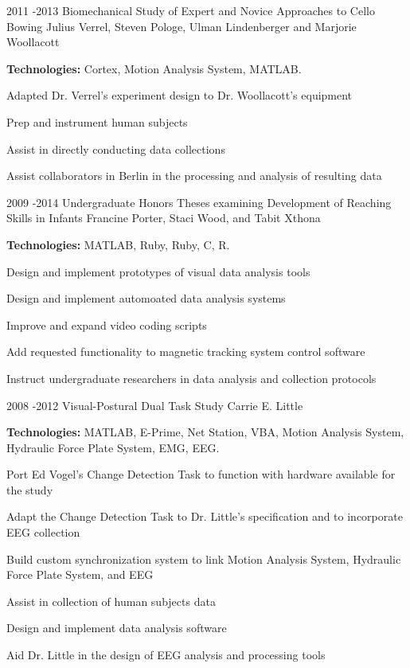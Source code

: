 \documentclass[10pt]{article} %
\begin{document}
\project
{2011 -}{2013}
{Biomechanical Study of Expert and Novice Approaches to Cello Bowing}
{Julius Verrel, Steven Pologe, Ulman Lindenberger and Marjorie Woollacott}
{
\rule{0mm}{5mm}\textbf{Technologies:} Cortex, Motion Analysis System, MATLAB.

\begin{itemize-noindent}
\setlength\itemsep{0.12em}
\item{Adapted Dr. Verrel's experiment design to Dr. Woollacott's equipment}
\item{Prep and instrument human subjects}
\item{Assist in directly conducting data collections}
\item{Assist collaborators in Berlin in the processing and analysis of resulting data}
\end{itemize-noindent}

}


\project
{2009 -}{2014}
{Undergraduate Honors Theses examining Development of Reaching Skills in Infants}
{Francine Porter, Staci Wood, and Tabit Xthona}
{\rule{0mm}{5mm}\textbf{Technologies:} MATLAB, Ruby, Ruby, C, R.

\begin{itemize-noindent}
\setlength\itemsep{0.12em}
\item{Design and implement prototypes of visual data analysis tools}
\item{Design and implement automoated data analysis systems}
\item{Improve and expand video coding scripts}
\item{Add requested functionality to magnetic tracking system control software}
\item{Instruct undergraduate researchers in data analysis and collection protocols}
\end{itemize-noindent}

}


\project
{2008 -}{2012}
{Visual-Postural Dual Task Study}
{Carrie E. Little}
{\rule{0mm}{5mm}\textbf{Technologies:} MATLAB, E-Prime, Net Station, VBA, Motion Analysis System, Hydraulic Force Plate System, EMG, EEG.

\begin{itemize-noindent}
\setlength\itemsep{0.12em}
\item{Port Ed Vogel's Change Detection Task to function with hardware available for the study}
\item{Adapt the Change Detection Task to Dr. Little's specification and to incorporate EEG collection}
\item{Build custom synchronization system to link Motion Analysis System, Hydraulic Force Plate System, and EEG}
\item{Assist in collection of human subjects data}
\item{Design and implement data analysis software}
\item{Aid Dr. Little in the design of EEG analysis and processing tools}
\end{itemize-noindent}

}
\end{document}
